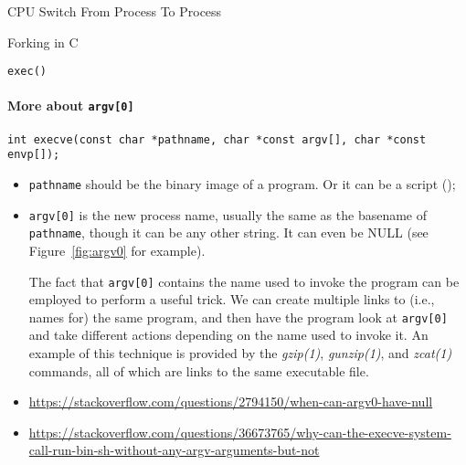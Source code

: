 \begin{frame}{CPU Switch From Process To Process}
  \begin{center}
  \end{center}
\end{frame}

\begin{frame}{Forking in C}
  \begin{center}
  \end{center}
\end{frame}

\begin{frame}{\texttt{exec()}}
  \begin{center}
  \end{center}
\end{frame}

\paragraph{More about \texttt{argv[0]}}

\texttt{int execve(const char *pathname, char *const argv[], char *const envp[]);}
\begin{itemize}
\item \texttt{pathname} should be the binary image of a program. Or it can be a script
  ();
\item \texttt{argv[0]} is the new process name, usually the same as the basename of
  \texttt{pathname}, though it can be any other string. It can even be NULL (see
  Figure~\ref{fig:argv0} for example).

  The fact that \texttt{argv[0]} contains the name used to invoke the program can be
  employed to perform a useful trick. We can create multiple links to (i.e., names for)
  the same program, and then have the program look at \texttt{argv[0]} and take different
  actions depending on the name used to invoke it. An example of this technique is
  provided by the \emph{gzip(1)}, \emph{gunzip(1)}, and \emph{zcat(1)} commands, all of
  which are links to the same executable
  file. 
\item \url{https://stackoverflow.com/questions/2794150/when-can-argv0-have-null}
\item \url{https://stackoverflow.com/questions/36673765/why-can-the-execve-system-call-run-bin-sh-without-any-argv-arguments-but-not}
\end{itemize}


